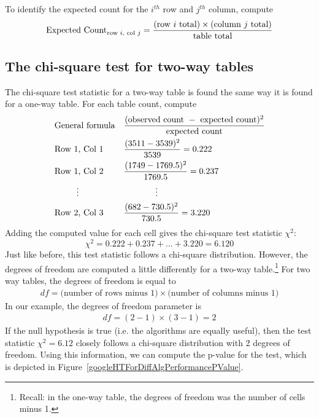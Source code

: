 \begin{termBox}{
To identify the expected count for the $i^{th}$ row and $j^{th}$ column, compute
$$\text{Expected Count}_{\text{row }i,\text{ col }j} = \frac{(\text{row $i$ total}) \times  (\text{column $j$ total})}{\text{table total}}\vspace{2mm}$$}
\end{termBox}


\textC{\newpage}


\subsection{The chi-square test for two-way tables}

The chi-square test statistic for a two-way table is found the same way it is found for a one-way table. For each table count, compute
\begin{align*}
&\text{General formula}& &\frac{(\text{observed count } - \text{ expected count})^2}{\text{expected count}} \\
&\text{Row 1, Col 1}& &\frac{(3511 - 3539)^2}{3539} = 0.222 \\
&\text{Row 1, Col 2}& &\frac{(1749 - 1769.5)^2}{1769.5} = 0.237 \\
& \hspace{9mm}\vdots & &\hspace{13mm}\vdots \\
&\text{Row 2, Col 3}& &\frac{(682 - 730.5)^2}{730.5} = 3.220
\end{align*}
Adding the computed value for each cell gives the chi-square test statistic $\chi^2$:
$$\chi^2 = 0.222 + 0.237 + \dots + 3.220 = 6.120$$
Just like before, this test statistic follows a chi-square distribution. However, the degrees of freedom are computed a little differently for a two-way table.\footnote{Recall: in the one-way table, the degrees of freedom was the number of cells minus 1.} For two way tables, the degrees of freedom is equal to
\begin{align*}
df = \text{(number of rows minus 1)}\times \text{(number of columns minus 1)}
\end{align*}
In our example, the degrees of freedom parameter is
\begin{align*}
df = (2-1)\times (3-1) = 2
\end{align*}
If the null hypothesis is true (i.e. the algorithms are equally useful), then the test statistic $\chi^2 = 6.12$ closely follows a chi-square distribution with 2 degrees of freedom. Using this information, we can compute the p-value for the test, which is depicted in Figure~\ref{googleHTForDiffAlgPerformancePValue}.

